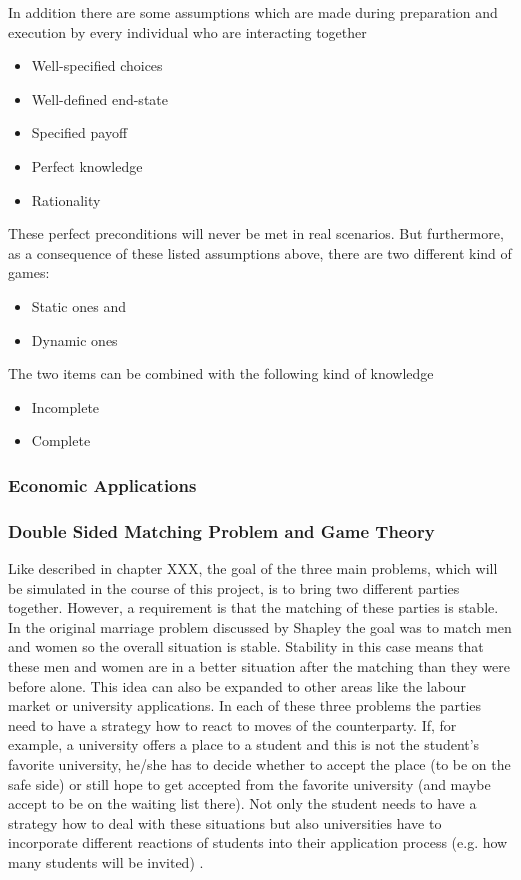 In addition there are some assumptions which are made during preparation and execution by every individual who are interacting together \cite {gibbons1997gametheory}
\begin{itemize}
	\item Well-specified choices
	\item Well-defined end-state
	\item Specified payoff
	\item Perfect knowledge
	\item Rationality 
\end{itemize}

These perfect preconditions will never be met in real scenarios.
But furthermore, as a consequence of these listed assumptions above, there are two different kind of games:

\begin{itemize}
	\item Static ones and
	\item Dynamic ones
\end{itemize}

The two items can be combined with the following kind of knowledge

\begin{itemize}
	\item Incomplete
	\item Complete
\end{itemize}


\subsubsection{Economic Applications}

\subsubsection{Double Sided Matching Problem and Game Theory}

Like described in chapter XXX, the goal of the three main problems, which will be simulated in the course of this project, is to bring two different parties together.
However, a requirement is that the matching of these parties is stable.
In the original marriage problem discussed by Shapley the goal was to match men and women so the overall situation is stable.
Stability in this case means that these men and women are in a better situation after the matching than they were before alone. 
This idea can also be expanded to other areas like the labour market or university applications.
In each of these three problems the parties need to have a strategy how to react to moves of the counterparty.
If, for example, a university offers a place to a student and this is not the student's favorite university, he/she has to decide whether to accept the place (to be on the safe side) or still hope to get accepted from the favorite university (and maybe accept to be on the waiting list there).
Not only the student needs to have a strategy how to deal with these situations but also universities have to incorporate different reactions of students into their application process (e.g. how many students will be invited) \cite {gale62a}.

